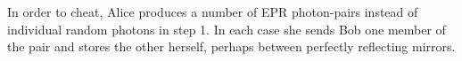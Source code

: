 In order to cheat, Alice produces a number of EPR photon-pairs instead of individual random pho­tons in step 1. In each case she sends Bob one mem­ber of the pair and stores the other herself, per­haps between perfectly reflecting mirrors. 


\subsection{\trnas}

\subsection{\review}

\subsection{\dic}
